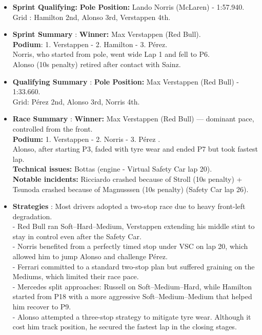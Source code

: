 \begin{itemize}
    \item \textbf{Sprint Qualifying:} \textbf{Pole Position:} Lando Norris (McLaren) - 1:57.940.\\
    Grid : Hamilton 2nd, Alonso 3rd, Verstappen 4th.

    \item \textbf{Sprint Summary} : \textbf{Winner:} Max Verstappen (Red Bull). \\
    \textbf{Podium}: 1. Verstappen - 2. Hamilton - 3. Pérez. \\
    Norris, who started from pole, went wide Lap 1 and fell to P6.\\
    Alonso (10s penalty) retired after contact with Sainz.

    \item \textbf{Qualifying Summary} : \textbf{Pole Position:} Max Verstappen (Red Bull) - 1:33.660. \\
    Grid: Pérez 2nd, Alonso 3rd, Norris 4th.\\

    \item \textbf{Race Summary} : \textbf{Winner:} Max Verstappen (Red Bull) — dominant pace, controlled from the front. \\
    \textbf{Podium:} 1. Verstappen - 2. Norris - 3. Pérez . \\
    Alonso, after starting P3, faded with tyre wear and ended P7 but took fastest lap.\\
    \textbf{Technical issues:} Bottas (engine - Virtual Safety Car lap 20).\\
    \textbf{Notable incidents:} Ricciardo crashed because of Stroll (10s penalty) + Tsunoda crashed because of Magnusssen (10s penalty) (Safety Car lap 26).

    \item \textbf{Strategies} : Most drivers adopted a two-stop race due to heavy front-left degradation. \\
    - Red Bull ran Soft–Hard–Medium, Verstappen extending his middle stint to stay in control even after the Safety Car. \\
    - Norris benefited from a perfectly timed stop under VSC on lap 20, which allowed him to jump Alonso and challenge Pérez. \\
    - Ferrari committed to a standard two-stop plan but suffered graining on the Mediums, which limited their race pace. \\
    - Mercedes split approaches: Russell on Soft–Medium–Hard, while Hamilton started from P18 with a more aggressive Soft–Medium–Medium that helped him recover to P9. \\
    - Alonso attempted a three-stop strategy to mitigate tyre wear. Although it cost him track position, he secured the fastest lap in the closing stages. \\


\end{itemize}
